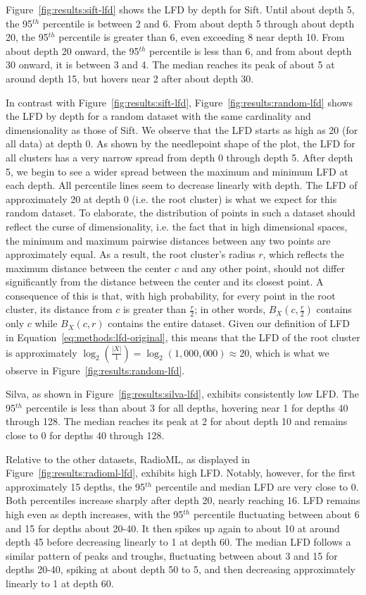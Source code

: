 Figure~\ref{fig:results:sift-lfd} shows the LFD by depth for Sift.
Until about depth 5, the 95$^{th}$ percentile is between 2 and 6.
From about depth 5 through about depth 20, the 95$^{th}$ percentile is greater than 6, even exceeding 8 near depth 10.
From about depth 20 onward, the 95$^{th}$ percentile is less than 6, and from about depth 30 onward, it is between 3 and 4.
The median reaches its peak of about 5 at around depth 15, but hovers near 2 after about depth 30.

In contrast with Figure~\ref{fig:results:sift-lfd}, Figure~\ref{fig:results:random-lfd} shows the LFD by depth for a random dataset with the same cardinality and dimensionality as those of Sift.
We observe that the LFD starts as high as 20 (for all data) at depth 0.
As shown by the needlepoint shape of the plot, the LFD for all clusters has a very narrow spread from depth 0 through depth 5.
After depth 5, we begin to see a wider spread between the maximum and minimum LFD at each depth.
All percentile lines seem to decrease linearly with depth.
The LFD of approximately 20 at depth 0 (i.e. the root cluster) is what we expect for this random dataset.
To elaborate, the distribution of points in such a dataset should reflect the curse of dimensionality, i.e. the fact that in high dimensional spaces, the minimum and maximum pairwise distances between any two points are approximately equal.
As a result, the root cluster's radius $r$, which reflects the maximum distance between the center $c$ and any other point, should not differ significantly from the distance between the center and its closest point.
A consequence of this is that, with high probability, for every point in the root cluster, its distance from $c$ is greater than $\tfrac{r}{2}$;
in other words, $B_X(c, \tfrac{r}{2})$ contains only $c$ while $B_X(c, r)$ contains the entire dataset.
Given our definition of LFD in Equation~\ref{eq:methods:lfd-original}, this means that the LFD of the root cluster is approximately $\log_2(\frac{|X|}{1}) = \log_2(1,000,000) \approx 20$, which is what we observe in Figure~\ref{fig:results:random-lfd}.

Silva, as shown in Figure~\ref{fig:results:silva-lfd}, exhibits consistently low LFD.
The 95$^{th}$ percentile is less than about 3 for all depths, hovering near 1 for depths 40 through 128.
The median reaches its peak at 2 for about depth 10 and remains close to 0 for depths 40 through 128.

Relative to the other datasets, RadioML, as displayed in Figure~\ref{fig:results:radioml-lfd}, exhibits high LFD.
Notably, however, for the first approximately 15 depths, the 95$^{th}$ percentile and median LFD are very close to 0.
Both percentiles increase sharply after depth 20, nearly reaching 16.
LFD remains high even as depth increases, with the 95$^{th}$ percentile fluctuating between about 6 and 15 for depths about 20-40.
It then spikes up again to about 10 at around depth 45 before decreasing linearly to 1 at depth 60.
The median LFD follows a similar pattern of peaks and troughs, fluctuating between about 3 and 15 for depths 20-40, spiking at about depth 50 to 5, and then decreasing approximately linearly to 1 at depth 60.

